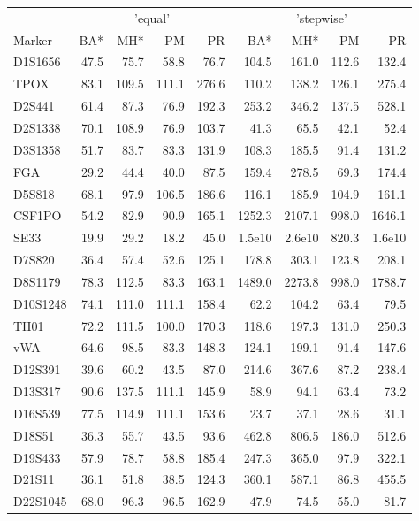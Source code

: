 \begin{table}[t]
\centering\small
\begin{tabular}{lrrrrrrrr}
\toprule
 & \multicolumn{4}{c}{'equal'} & \multicolumn{4}{c}{'stepwise'} \\ 
\cmidrule(lr){2-5} \cmidrule(lr){6-9}
Marker & BA* & MH* & PM & PR & BA* & MH* & PM & PR \\ 
\midrule
D1S1656 & 47.5 & 75.7 & 58.8 & 76.7 & 104.5 & 161.0 & 112.6 & 132.4 \\ 
TPOX & 83.1 & 109.5 & 111.1 & 276.6 & 110.2 & 138.2 & 126.1 & 275.4 \\ 
D2S441 & 61.4 & 87.3 & 76.9 & 192.3 & 253.2 & 346.2 & 137.5 & 528.1 \\ 
D2S1338 & 70.1 & 108.9 & 76.9 & 103.7 & 41.3 & 65.5 & 42.1 & 52.4 \\ 
D3S1358 & 51.7 & 83.7 & 83.3 & 131.9 & 108.3 & 185.5 & 91.4 & 131.2 \\ 
FGA & 29.2 & 44.4 & 40.0 & 87.5 & 159.4 & 278.5 & 69.3 & 174.4 \\ 
D5S818 & 68.1 & 97.9 & 106.5 & 186.6 & 116.1 & 185.9 & 104.9 & 161.1 \\ 
CSF1PO & 54.2 & 82.9 & 90.9 & 165.1 & 1252.3 & 2107.1 & 998.0 & 1646.1 \\ 
SE33 & 19.9 & 29.2 & 18.2 & 45.0 & 1.5e10 & 2.6e10 & 820.3 & 1.6e10 \\ 
D7S820 & 36.4 & 57.4 & 52.6 & 125.1 & 178.8 & 303.1 & 123.8 & 208.1 \\ 
D8S1179 & 78.3 & 112.5 & 83.3 & 163.1 & 1489.0 & 2273.8 & 998.0 & 1788.7 \\ 
D10S1248 & 74.1 & 111.0 & 111.1 & 158.4 & 62.2 & 104.2 & 63.4 & 79.5 \\ 
TH01 & 72.2 & 111.5 & 100.0 & 170.3 & 118.6 & 197.3 & 131.0 & 250.3 \\ 
vWA & 64.6 & 98.5 & 83.3 & 148.3 & 124.1 & 199.1 & 91.4 & 147.6 \\ 
D12S391 & 39.6 & 60.2 & 43.5 & 87.0 & 214.6 & 367.6 & 87.2 & 238.4 \\ 
D13S317 & 90.6 & 137.5 & 111.1 & 145.9 & 58.9 & 94.1 & 63.4 & 73.2 \\ 
D16S539 & 77.5 & 114.9 & 111.1 & 153.6 & 23.7 & 37.1 & 28.6 & 31.1 \\ 
D18S51 & 36.3 & 55.7 & 43.5 & 93.6 & 462.8 & 806.5 & 186.0 & 512.6 \\ 
D19S433 & 57.9 & 78.7 & 58.8 & 185.4 & 247.3 & 365.0 & 97.9 & 322.1 \\ 
D21S11 & 36.1 & 51.8 & 38.5 & 124.3 & 360.1 & 587.1 & 86.8 & 455.5 \\ 
D22S1045 & 68.0 & 96.3 & 96.5 & 162.9 & 47.9 & 74.5 & 55.0 & 81.7 \\ 
\bottomrule
\end{tabular}
\end{table}

